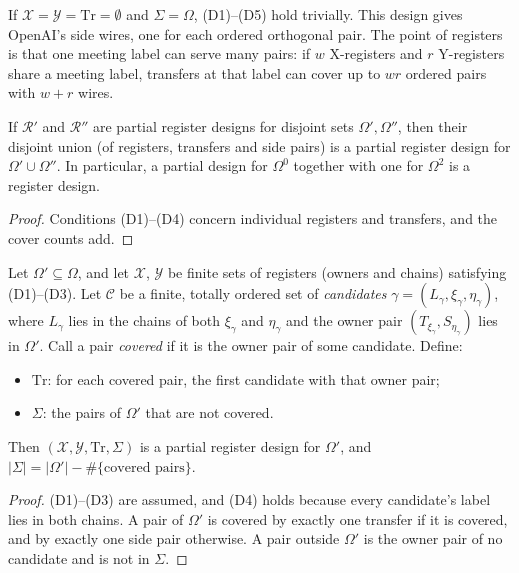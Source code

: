 If $\mathcal X=\mathcal Y=\mathrm{Tr}=\emptyset$ and $\Sigma=\Omega$, (D1)--(D5) hold trivially. This
design gives OpenAI's side wires, one for each ordered orthogonal pair. The point of registers is that
one meeting label can serve many pairs: if $w$ X-registers and $r$ Y-registers share a meeting label,
transfers at that label can cover up to $wr$ ordered pairs with $w+r$ wires.

\begin{lemma}[union]\label{col:lem:union}
If $\mathcal R'$ and $\mathcal R''$ are partial register designs for disjoint sets $\Omega',\Omega''$, then
their disjoint union (of registers, transfers and side pairs) is a partial register design for
$\Omega'\cup\Omega''$. In particular, a partial design for $\Omega^0$ together with one for $\Omega^2$ is a
register design.
\end{lemma}

\begin{proof}
Conditions (D1)--(D4) concern individual registers and transfers, and the cover counts add.
\end{proof}

\begin{lemma}\label{col:lem:firstcover}
Let $\Omega'\subseteq\Omega$, and let $\mathcal X$, $\mathcal Y$ be finite sets of registers (owners and
chains) satisfying (D1)--(D3). Let $\mathcal C$ be a finite, totally ordered set of \emph{candidates}
$\gamma=(L_\gamma,\xi_\gamma,\eta_\gamma)$, where $L_\gamma$ lies in the chains of both $\xi_\gamma$ and
$\eta_\gamma$ and the owner pair $(T_{\xi_\gamma},S_{\eta_\gamma})$ lies in $\Omega'$. Call a pair
\emph{covered} if it is the owner pair of some candidate. Define:
\begin{itemize}
\item $\mathrm{Tr}$: for each covered pair, the first candidate with that owner pair;
\item $\Sigma$: the pairs of $\Omega'$ that are not covered.
\end{itemize}
Then $(\mathcal X,\mathcal Y,\mathrm{Tr},\Sigma)$ is a partial register design for $\Omega'$, and
$|\Sigma|=|\Omega'|-\#\{\text{covered pairs}\}$.
\end{lemma}

\begin{proof}
(D1)--(D3) are assumed, and (D4) holds because every candidate's label lies in both chains. A pair of
$\Omega'$ is covered by exactly one transfer if it is covered, and by exactly one side pair otherwise.
A pair outside $\Omega'$ is the owner pair of no candidate and is not in $\Sigma$.
\end{proof}

